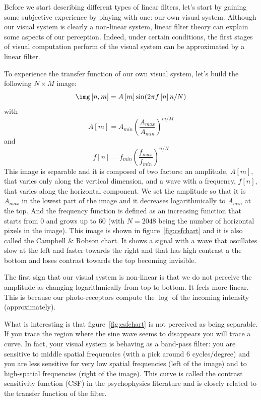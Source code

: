 Before we start describing different types of linear filters, let's start by gaining some subjective experience by playing with one: our own visual system. Although our visual system is clearly a non-linear system, linear filter theory can explain some aspects of our perception. Indeed, under certain conditions, the first stages of visual computation perform of the visual system can be approximated by a linear filter. 

To experience the transfer function of our own visual system, let's build the following $N \times M$ image:
\begin{equation}
\img \left[n,m\right] = A\left[m\right] \sin(2 \pi f\left[n\right] n/N)
\end{equation}
with
\begin{equation}
A\left[m\right] = A_{min} \left(\frac{A_{max}}{A_{min}}\right)^{m/M}
\end{equation}
and
\begin{equation}
f\left[n\right] = f_{min} \left(\frac{f_{max}}{f_{min}}\right)^{n/N}
\end{equation}
This image is separable and it is composed of two factors: an amplitude, $A\left[m\right]$, that varies only along the vertical dimension, and a wave with a frequency, $f\left[n\right]$, that varies along the horizontal component. We set the amplitude so that it is $A_{max}$ in the lowest part of the image and it decreases logarithmically to $A_{min}$ at the top. And the frequency function is defined as an increasing function that starts from 0 and grows up to 60 (with $N=2048$ being the number of horizontal pixels in the image). This image is shown in figure~\ref{fig:csfchart} and it is also called the Campbell \& Robson chart. It shows a signal with a wave that oscillates slow at the left and faster towards the right and that has high contrast a the bottom and loses contrast towards the top becoming invisible.

The first sign that our visual system is non-linear is that we do not perceive the amplitude as changing logarithmically from top to bottom. It feels more linear. This is because our photo-receptors compute the $\log$ of the incoming intensity (approximately).

What is interesting is that figure~\ref{fig:csfchart} is not perceived as being separable. If you trace the region where the sine wave seems to disappears you will trace a curve. In fact, your visual system is behaving as a band-pass filter: you are sensitive to middle spatial frequencies (with a pick around 6 cycles/degree) and you are less sensitive for very low spatial frequencies (left of the image) and to high-spatial frequencies (right of the image). This curve is called the contrast sensitivity function (CSF) in the psychophysics literature and is closely related to the transfer function of the filter. 

